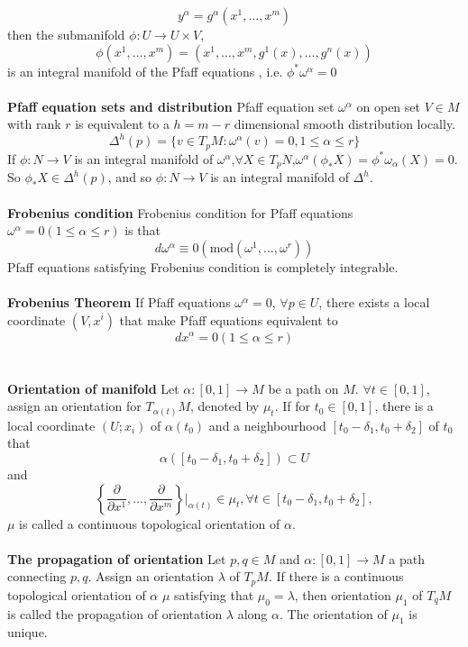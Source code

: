 \documentclass{article}
\begin{document}
\[y^{\alpha} = g^{\alpha}(x^1,\ldots,x^m)\]
then the submanifold $\phi:U \to U \times V$,
\[\phi(x^1,\ldots,x^m) = (x^1,\ldots,x^m,g^1(x),\ldots,g^n(x))\]
is an integral manifold of the Pfaff equations , i.e. $\phi^* \omega^{\alpha} =0$\\ \\
\textbf{Pfaff equation sets and distribution} Pfaff equation set $\omega^{\alpha}$ on open set $V \in M$ with rank $r$ is equivalent to a $h=m-r$ dimensional smooth distribution locally.
\[\Delta^h(p) = \{v \in T_pM:\omega^{\alpha}(v)=0,1 \le \alpha \le r \}\]
If $\phi:N \to V$ is an integral manifold of $\omega^{\alpha}$,$\forall X \in T_pN$,$\omega^{\alpha}(\phi_{*}X) = \phi^* \omega_{\alpha}(X) =0$. So $\phi_* X \in \Delta^h(p)$, and so $\phi:N \to V$ is an integral manifold of $\Delta^h$.\\ \\
\textbf{Frobenius condition} Frobenius condition for Pfaff equations $\omega^{\alpha} =0(1 \le \alpha \le r)$ is that
\[d\omega^{\alpha} \equiv 0(\mathrm{mod}(\omega^1,\ldots,\omega^r))\]
Pfaff equations satisfying Frobenius condition is completely integrable.\\ \\
\textbf{Frobenius Theorem} If Pfaff equations $\omega^{\alpha} = 0$, $\forall p \in U$, there exists a local coordinate $(V,x^i)$ that make Pfaff equations equivalent to
\[dx^{\alpha}=0 (1 \le \alpha \le r)\]\\ \\
\textbf{Orientation of manifold} Let $\alpha:[0,1] \to M$ be a path on $M$. $\forall t \in [0,1]$, assign an orientation for $T_{\alpha(t)}M$, denoted by $\mu_t$. If for $t_0 \in [0,1]$, there is a local coordinate $(U;x_i)$ of $\alpha(t_0)$ and a neighbourhood $[t_0-\delta_1,t_0+\delta_2]$ of $t_0$ that
\[\alpha([t_0-\delta_1,t_0+\delta_2]) \subset U\] 
and
\[\left\{ \frac{\partial}{\partial x^1},\ldots,\frac{\partial}{\partial x^m}\right\}|_{\alpha(t)} \in \mu_t,\forall t \in [t_0-\delta_1,t_0+\delta_2],\] 
$\mu$ is called a continuous topological orientation of $\alpha$.\\ \\
\textbf{The propagation of orientation} Let $p,q \in M$ and $\alpha:[0,1] \to M$ a path connecting $p,q$. Assign an orientation $\lambda$ of $T_pM$. If there is a continuous topological orientation of $\alpha$ $\mu$ satisfying that $\mu_0 = \lambda$, then orientation $\mu_1$ of $T_qM$ is called the propagation of orientation $\lambda$ along $\alpha$. The orientation of $\mu_1$ is unique.\\ \\
\end{document}
